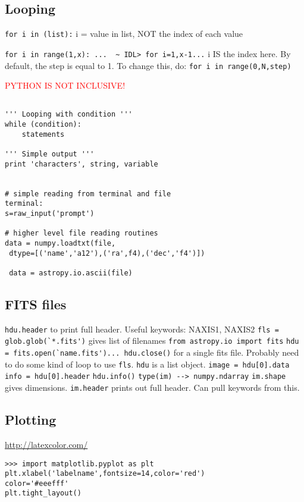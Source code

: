 \documentclass{article}
\begin{document}
\subsection{Looping}
\verb|for i in (list):| i = value in list, NOT the index of each value

\verb|for i in range(1,x): ...  ~ IDL> for i=1,x-1...| i IS the index here.
By default, the step is equal to 1. To change this, do:
\verb|for i in range(0,N,step)|

\textcolor{red}{PYTHON IS NOT INCLUSIVE!}

\begin{verbatim}

''' Looping with condition '''
while (condition):
    statements

''' Simple output '''
print 'characters', string, variable


# simple reading from terminal and file
terminal:
s=raw_input('prompt')

# higher level file reading routines
data = numpy.loadtxt(file,
 dtype=[('name','a12'),('ra',f4),('dec','f4')])

 data = astropy.io.ascii(file)

\end{verbatim}

\subsection{FITS files}
\verb|hdu.header| to print full header. Useful keywords: NAXIS1, NAXIS2
\verb|fls = glob.glob(`*.fits')| gives list of filenames
\verb|from astropy.io import fits|
\verb|hdu = fits.open(`name.fits')... hdu.close()| for a single fits file. Probably
need to do some kind of loop to use \verb|fls|. \verb|hdu| is a list object.
\verb|image = hdu[0].data|
\verb|info = hdu[0].header|
\verb|hdu.info()|
\verb|type(im) --> numpy.ndarray|
\verb|im.shape| gives dimensions.
\verb|im.header| prints out full header. Can pull keywords from this.

\subsection{Plotting}
\url{http://latexcolor.com/}

\begin{verbatim}
>>> import matplotlib.pyplot as plt
plt.xlabel('labelname',fontsize=14,color='red')
color='#eeefff'
plt.tight_layout()
\end{verbatim}
\end{document}
